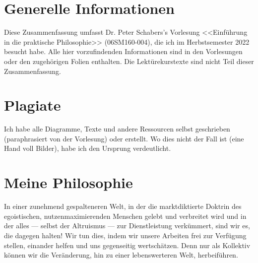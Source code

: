 \documentclass[../main.tex]{subfiles}
\begin{document}
\section{Generelle Informationen}
Diese Zusammenfassung umfasst Dr. Peter Schabers's Vorlesung <<Einführung in die praktische Philosophie>> (06SM160-004), die ich im Herbstsemester 2022 besucht habe. Alle hier vorzufindenden Informationen sind in den Vorlesungen oder den zugehörigen Folien enthalten. Die Lektürekurstexte sind nicht Teil dieser Zusammenfassung. 

\section{Plagiate}
Ich habe alle Diagramme, Texte und andere Ressourcen selbst geschrieben (paraphrasiert von der Vorlesung) oder erstellt. Wo dies nicht der Fall ist (eine Hand voll Bilder), habe ich den Ursprung verdeutlicht. 

\section{Meine Philosophie}
In einer zunehmend gespalteneren Welt, in der die marktdiktierte Doktrin des egoistischen, nutzenmaximierenden Menschen gelebt und verbreitet wird und in der alles — selbst der Altruismus — zur Dienstleistung verkümmert, sind wir es, die dagegen halten! Wir tun dies, indem wir unsere Arbeiten frei zur Verfügung stellen, einander helfen und uns gegenseitig wertschätzen. Denn nur als Kollektiv können wir die Veränderung, hin zu einer lebenswerteren Welt, herbeiführen. 
\end{document}
